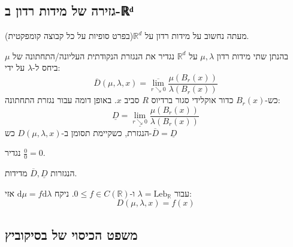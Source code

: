 \documentclass{tstextbook}
\begin{document}
\subsection{גזירה של מידות רדון ב-ℝᵈ}

מעתה נחשוב על מידות רדון על \(\mathbb{R}^{d}\)(בפרט סופיות על כל קבוצה קומפקטית).

\begin{definition}
בהנתן שתי מידות רדון \(\mu,\lambda\) על \(\mathbb{R}^{d}\) נגדיר את הנגזרת הנקודתית העליונה/התחתונה של \(\mu\) ביחס ל-\(\lambda\) על ידי:
$$\overline{D} \left( \mu,\lambda,x \right)=\overline{\lim_{ r\searrow 0 } } \frac{\mu(B_{r}(x))}{\lambda(B_{r}(x))}$$
כש-\(B_{r}(x)\) כדור אוקלידי סגור ברדיוס \(R\) סביב \(x\). באופן דומה עבור נגזרת התחתונה:
$$\underline{D}=\underline{\lim_{ r \searrow 0 } }  \frac{\mu(B_{r}(x))}{\lambda(B_{r}(x))}$$
הנגזרת, כשקיימת תסומן ב-\(D\left( \mu,\lambda,x \right)\) כש-\(\overline{D}=\underline{D}\)

\end{definition}
\begin{remark}
נגדיר \(\frac{0}{0}=0\).

\end{remark}
\begin{remark}
הנגזרות \(\overline{D},\underline{D}\) מדידות.

\end{remark}
\begin{example}
עבור \(\lambda=\mathrm{Leb}_{\mathbb{R}}\) ו-\(0\leq f \in C\left( \mathbb{R} \right)\). ניקח \(\mathrm{d}\mu=f\mathrm{d}\lambda\) אזי:
$$D\left( \mu,\lambda,x \right)=f(x)$$

\end{example}
\subsection{משפט הכיסוי של בסיקוביץ}
\end{document}
